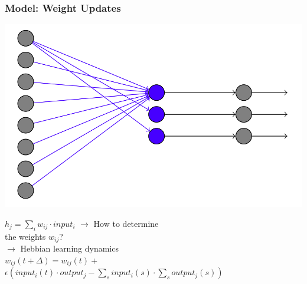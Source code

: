 \begin{frame}
\frametitle{Model: Weight Updates}
\begin{multicols}{2}
\begin{center}
\includegraphics[scale=.1]{pics/model_output_2}
\end{center}
\columnbreak
\begin{center}
$h_j = \sum_i w_{ij} \cdot input_i$
\vskip 5mm
$\rightarrow$ How to determine\\ \hskip 4mm the weights $w_{ij}$?\\
$\rightarrow$ Hebbian learning dynamics\\
\vskip 4mm
$w_{ij}(t+\Delta)=w_{ij}(t)+$\\
$ \epsilon (input_i(t)\cdot output_j - \sum_s input_i (s) \cdot \sum_s output_j(s))$
\end{center}
\end{multicols}
\end{frame}
